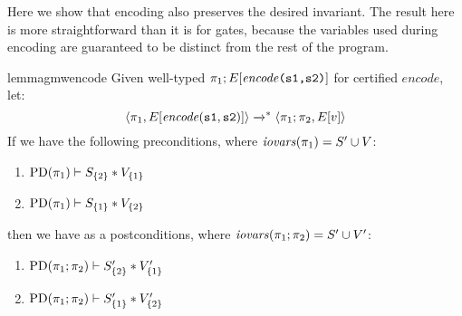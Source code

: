 Here we show that encoding also preserves the desired invariant.
The result here is more straightforward than it is for gates, because
the variables used during encoding are guaranteed to be distinct from
the rest of the program.
\begin{restatable}{lemma}{gmwencode}
  \label{lemma-gmw-encode}
  Given well-typed $\pi_1;E[\mathit{encode}\texttt{(s1,s2)}]$ for certified $\mathit{encode}$, let:
  $$
  \langle \pi_1,E[\mathit{encode}(\texttt{s1},\texttt{s2})] \rangle \xrightarrow{}^{*}
  \langle \pi_1;\pi_2,E[v] \rangle
  $$
  If we have the following preconditions, where $\mathit{iovars}(\pi_1) = S' \cup V$:
  \begin{enumerate}[\hspace{5mm}i.]
  \item $\mathrm{PD}(\pi_1) \vdash S_{\{2\}} * V_{\{1\}}$
  \item $\mathrm{PD}(\pi_1) \vdash S_{\{1\}} * V_{\{2\}}$
  \end{enumerate}
  then we have as a postconditions, where $\mathit{iovars}(\pi_1;\pi_2) = S' \cup V'$: 
  \begin{enumerate}[\hspace{5mm}i.]
  \item $\mathrm{PD}(\pi_1;\pi_2) \vdash S'_{\{2\}} * V'_{\{1\}}$
  \item $\mathrm{PD}(\pi_1;\pi_2) \vdash S'_{\{1\}} * V'_{\{2\}}$
  \end{enumerate}
\end{restatable}

